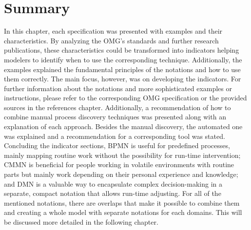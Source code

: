 \section{Summary}
In this chapter, each specification was presented with examples and their characteristics. By analyzing the OMG's standards and further research publications, these characteristics could be transformed into indicators helping modelers to identify when to use the corresponding technique. Additionally, the examples explained the fundamental principles of the notations and how to use them correctly. The main focus, however, was on developing the indicators. For further information about the notations and more sophisticated examples or instructions, please refer to the corresponding OMG specification or the provided sources in the references chapter. 
Additionally, a recommendation of how to combine manual process discovery techniques was presented along with an explanation of each approach. Besides the manual discovery, the automated one was explained and a recommendation for a corresponding tool was stated. 
Concluding the indicator sections, BPMN is useful for predefined processes, mainly mapping routine work without the possibility for run-time intervention; CMMN is beneficial for people working in volatile environments with routine parts but mainly work depending on their personal experience and knowledge; and DMN is a valuable way to encapsulate complex decision-making in a separate, compact notation that allows run-time adjusting. For all of the mentioned notations, there are overlaps that make it possible to combine them and creating a whole model with separate notations for each domains. This will be discussed more detailed in the following chapter.  

\listoftodos
